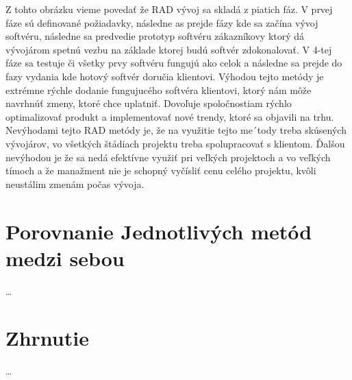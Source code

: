 \documentclass[10pt,oneside,slovak,a4paper]{article}
\begin{document}
Z tohto obrázku vieme povedať že RAD vývoj sa skladá z piatich fáz. V prvej fáze sú definované požiadavky, následne as prejde fázy kde sa začína vývoj softvéru, následne sa predvedie prototyp softvéru zákazníkovy ktorý dá vývojárom spetnú vezbu na základe ktorej budú softvér zdokonalovať. V 4-tej fáze sa testuje či všetky prvy softvéru fungujú ako celok a následne sa prejde do fazy vydania kde hotový softvér doručia klientovi. Výhodou tejto metódy je extrémne rýchle dodanie fungujucého softvéra klientovi,  ktorý nám môže navrhnúť zmeny, ktoré chce uplatniť. Dovoľuje spoločnostiam rýchlo optimalizovať produkt a implementovať nové trendy, ktoré sa objavili na trhu. Nevýhodami tejto RAD metódy je, že na využitie tejto me´tody treba skúsených vývojárov, vo všetkých štádiach projektu treba spolupracovať s klientom. Ďalšou nevýhodou je že sa nedá efektívne využiť pri veľkých projektoch a vo veľkých tímoch a že manažment nie je schopný vyčísliť cenu celého projektu, kvôli neustálim zmenám počas vývoja.


\section{Porovnanie Jednotlivých metód medzi sebou}\label{porovnávanie}
\ldots
\section{Zhrnutie}\label{zaver}
\ldots


\end{document}
